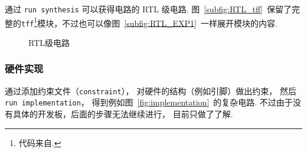 \documentclass[fontset=windows,11pt]{SEU-Digital-Report}
\begin{document}
                通过 \texttt{run synthesis} 可以获得电路的 RTL 级电路.
                图~\ref{subfig:RTL_tff}~保留了完整的\texttt{tff}\footnote{代码来自\cite{github:fpga-verilog}.}模块，不过也可以像图~\ref{subfig:RTL_EXP1}~一样展开模块的内容.

                \begin{figure}[htbp]
                    \centering
                    \hfill
                    \caption{RTL级电路}
                    \label{fig:RTL}
                \end{figure}

            \subsubsection{硬件实现}

                通过添加约束文件（\texttt{constraint}），
                对硬件的结构（例如引脚）做出约束，
                然后 \texttt{run implementation}，
                得到例如图~\ref{fig:implementation}~的复杂电路.
                不过由于没有具体的开发板，后面的步骤无法继续进行，
                目前只做了了解.
\end{document}

